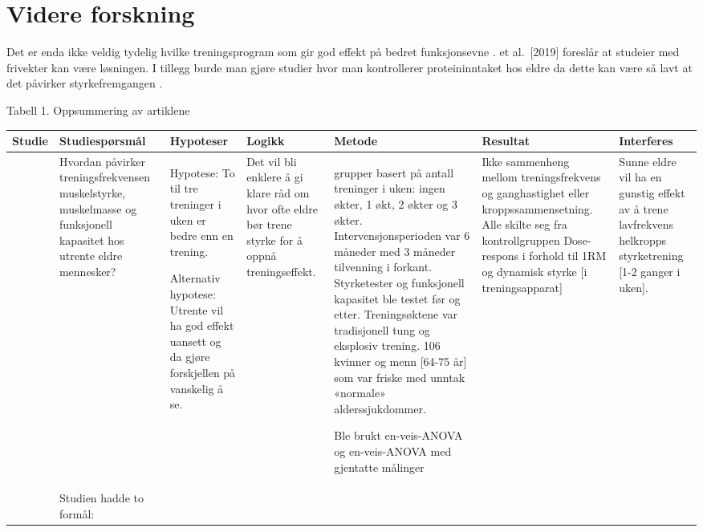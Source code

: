 \documentclass[
]{book}
\begin{document}
\hypertarget{videre-forskning}{%
\section{Videre forskning}\label{videre-forskning}}

Det er enda ikke veldig tydelig hvilke treningsprogram som gir god effekt på bedret funksjonsevne \citep[ et al.~2017]{Turpela}.
\citet{Schott} et al.~{[}2019{]} foreslår at studeier med frivekter kan være løsningen.
I tillegg burde man gjøre studier hvor man kontrollerer proteininntaket hos eldre da dette kan være så lavt at det påvirker styrkefremgangen \citep[ et al.~2017]{Turpela}.

Tabell 1.
Oppsummering av artiklene

\begin{longtable}[]{@{}
  >{\raggedright\arraybackslash}p{}
  >{\raggedright\arraybackslash}p{}
  >{\raggedright\arraybackslash}p{}
  >{\raggedright\arraybackslash}p{}
  >{\raggedright\arraybackslash}p{}
  >{\raggedright\arraybackslash}p{}
  >{\raggedright\arraybackslash}p{}@{}}
\toprule
Studie & Studiespørsmål & Hypoteser & Logikk & Metode & Resultat & Interferes \\
\midrule
\endhead
\citep[ et al.~2017]{Turpela} \textbar{} & Hvordan påvirker \textbar{}
treningsfrekvensen muskelstyrke, muskelmasse og funksjonell kapasitet hos
utrente eldre mennesker? & Hypotese: To til \textbar{}
tre treninger i uken er bedre enn en trening.

Alternativ
hypotese: Utrente vil ha god effekt uansett og da gjøre forskjellen på
vanskelig å se. & Det vil bli enklere å \textbar{}
gi klare råd om hvor ofte eldre bør trene styrke for å oppnå treningseffekt. & 4 grupper basert på \textbar{}
antall treninger i uken: ingen økter, 1 økt, 2 økter og 3 økter.
Intervensjonsperioden var 6 måneder med 3 måneder tilvenning i forkant. Styrketester
og funksjonell kapasitet ble testet før og etter. Treningsøktene var
tradisjonell tung og eksplosiv trening. 106 kvinner og menn {[}64-75 år{]} som
var friske med unntak «normale» alderssjukdommer.

Ble brukt
en-veis-ANOVA og en-veis-ANOVA med gjentatte målinger & Ikke sammenheng \textbar{}
mellom treningsfrekvens og ganghastighet eller kroppssammensetning. Alle
skilte seg fra kontrollgruppen Dose-respons i forhold til 1RM og dynamisk
styrke {[}i treningsapparat{]} & Sunne eldre vil ha en
gunstig effekt av å trene lavfrekvens helkropps styrketrening {[}1-2 ganger i
uken{]}. \\
\citep[Johnen, and Holfelder 2019]{Schott} \textbar{} & Studien hadde to \textbar{}
formål:


\end{longtable}
\end{document}
